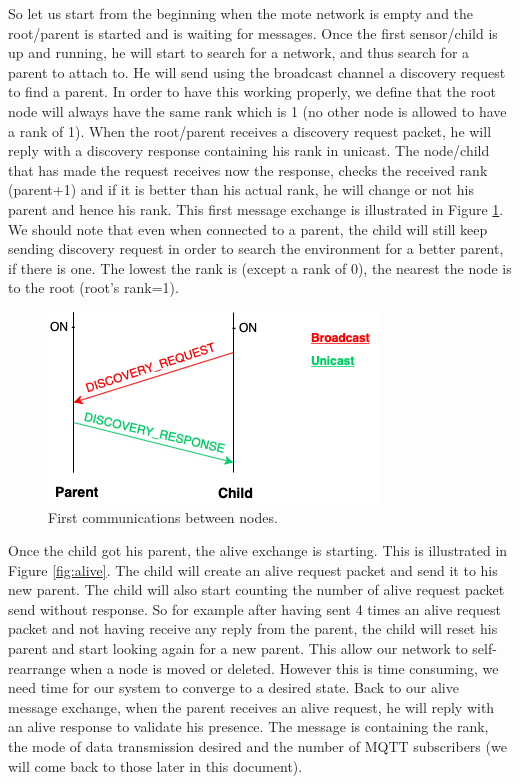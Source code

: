 \documentclass[a4paper,10pt]{article}
\begin{document}
So let us start from the beginning when the mote network is empty and the root/parent is started and is waiting for messages. Once the first sensor/child is up and running, he will start to search for a network, and thus search for a parent to attach to. He will send using the broadcast channel a discovery request to find a parent. In order to have this working properly, we define that the root node will always have the same rank which is 1 (no other node is allowed to have a rank of 1). When the root/parent receives a discovery request packet, he will reply with a discovery response containing his rank in unicast. The node/child that has made the request receives now the response, checks the received rank (parent+1) and if it is better than his actual rank, he will change or not his parent and hence his rank. This first message exchange is illustrated in Figure \ref{fig:bd}. We should note that even when connected to a parent, the child will still keep sending discovery request in order to search the environment for a better parent, if there is one. The lowest the rank is (except a rank of 0), the nearest the node is to the root (root's rank=1).\\

\begin{figure}[!htb]
\centering
\includegraphics[scale=0.6]{./img/discovery.png}
\caption{First communications between nodes.}
\label{fig:bd}
\end{figure}

Once the child got his parent, the alive exchange is starting. This is illustrated in Figure \ref{fig:alive}. The child will create an alive request packet and send it to his new parent. The child will also start counting the number of alive request packet send without response. So for example after having sent 4 times an alive request packet and not having receive any reply from the parent, the child will reset his parent and start looking again for a new parent. This allow our network to self-rearrange when a node is moved or deleted. However this is time consuming, we need time for our system to converge to a desired state. Back to our alive message exchange, when the parent receives an alive request, he will reply with an alive response to validate his presence. The message is containing the rank, the mode of data transmission desired and the number of MQTT subscribers (we will come back to those later in this document).\\
\end{document}
